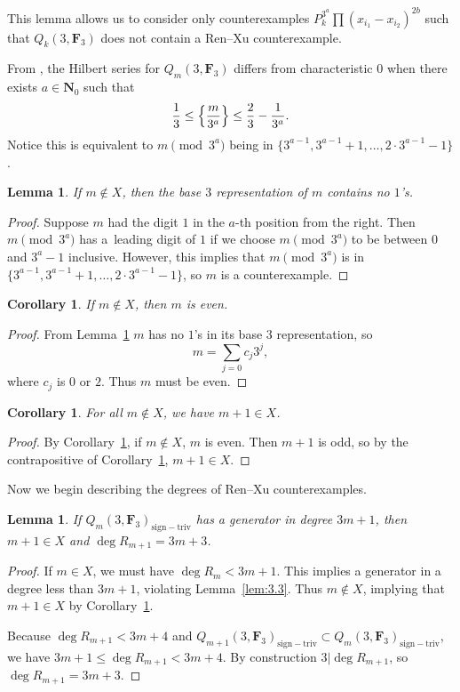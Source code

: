 \documentclass[pdftex]{sigma}
\newtheorem{Corollary}[Theorem]{Corollary}
\newtheorem{Lemma}[Theorem]{Lemma}
\theoremstyle{definition}
\numberwithin{equation}{section}
\newcommand{\siv}{\mathrm{sign-triv}}
\begin{document}
This lemma allows us to consider only counterexamples $P_k^{3^a}\prod (x_{i_1}-x_{i_2})^{2b}$ such that $Q_k(3,\mathbf{F}_3)$ does not contain a Ren--Xu counterexample.

From \cite{Ren_2020}, the Hilbert series for $Q_m(3,\mathbf{F}_3)$ differs from characteristic $0$ when there exists $a\in \mathbf{N}_0$ such that
\[\frac{1}{3}\leq \Bigl\{\frac{m}{3^a}\Bigr\}\leq \frac{2}{3}-\frac{1}{3^a}.\]
Notice this is equivalent to $m \pmod{3^a}$ being in $\bigl\{3^{a-1},3^{a-1}+1,\dots,2\cdot 3^{a-1}-1\bigr\}$.

\begin{Lemma} \label{noOnes}
 If $m\not\in X$, then the base $3$ representation of $m$ contains no $1$'s.
\end{Lemma}
\begin{proof}
 Suppose $m$ had the digit $1$ in the $a$-th position from the right. Then $m\pmod{3^a}$ has a~leading digit of $1$ if we choose $m\pmod{3^a}$ to be between $0$ and $3^a-1$ inclusive. However, this implies that $m \pmod{3^a}$ is in $\bigl\{3^{a-1},3^{a-1}+1,\dots,2\cdot 3^{a-1}-1\bigr\}$, so $m$ is a counterexample.
\end{proof}

\begin{Corollary}\label{evenCounter}
 If $m\not\in X$, then $m$ is even.
\end{Corollary}
\begin{proof}
 From Lemma~\ref{noOnes} $m$ has no $1$'s in its base $3$ representation, so
 \[m=\sum_{j=0}c_j3^j,\]
 where $c_j$ is $0$ or $2$. Thus $m$ must be even.
\end{proof}

\begin{Corollary}\label{noConsec}
 For all $m\not\in X$, we have $m+1\in X$.
\end{Corollary}
\begin{proof}
 By Corollary~\ref{evenCounter}, if $m\not\in X$, $m$ is even. Then $m+1$ is odd, so by the contrapositive of Corollary~\ref{evenCounter}, $m+1\in X$.
\end{proof}

Now we begin describing the degrees of Ren--Xu counterexamples.

\begin{Lemma} \label{countEx3m+3}
 If $Q_m(3,\mathbf{F}_3)_{\siv}$ has a generator in degree $3m+1$, then $m+1\in X$ and $\deg R_{m+1}=3m+3$.
\end{Lemma}
\begin{proof}
 If $m\in X$, we must have $\deg R_m<3m+1$. This implies a generator in a degree less than $3m+1$, violating Lemma~\ref{lem:3.3}. Thus $m\not\in X$, implying that $m+1\in X$ by Corollary~\ref{noConsec}.

 Because $\deg R_{m+1}<3m+4$ and $Q_{m+1}(3,\mathbf{F}_3)_\siv\subset Q_{m}(3,\mathbf{F}_3)_\siv$, we have $3m+1\leq\deg R_{m+1}< 3m+4$. By construction $3|\deg R_{m+1}$, so $\deg R_{m+1}= 3m+3$.
\end{proof}
\end{document}
